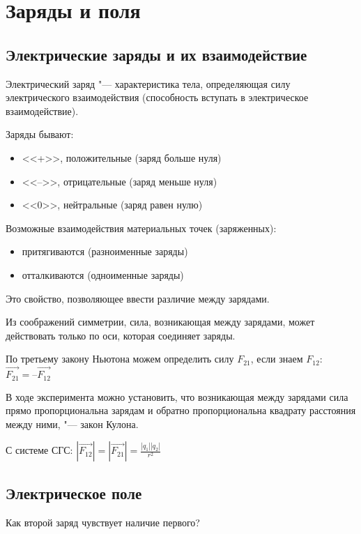 \chapter{Заряды и поля}

\section{Электрические заряды и их взаимодействие}

\begin{Def}
Электрический заряд "--- характеристика тела, определяющая силу электрического взаимодействия (способность вступать в электрическое взаимодействие).
\end{Def}

Заряды бывают:
\begin{itemize}
\item <<+>>, положительные (заряд больше нуля)
\item <<–>>, отрицательные (заряд меньше нуля)
\item <<0>>, нейтральные   (заряд равен нулю)
\end{itemize}

Возможные взаимодействия материальных точек (заряженных):
\begin{itemize}
\item притягиваются (разноименные заряды)
\item отталкиваются (одноименные заряды)
\end{itemize}
Это свойство, позволяющее ввести различие между зарядами.

Из соображений симметрии, сила, возникающая между зарядами, может действовать только по оси, которая соединяет заряды.

По третьему закону Ньютона можем определить силу $F_21$, если знаем $F_12$: $\overrightarrow{F_21} = – \overrightarrow{F_12}$

В ходе эксперимента можно установить, что возникающая между зарядами сила прямо пропорциональна зарядам и обратно пропорциональна квадрату расстояния между ними, "--- закон Кулона.

С системе СГС: $|\overrightarrow{F_12} | = |\overrightarrow{F_21}| = \frac{|q_1||q_2|}{r^2}$

\section{Электрическое поле}
Как второй заряд чувствует наличие первого?

